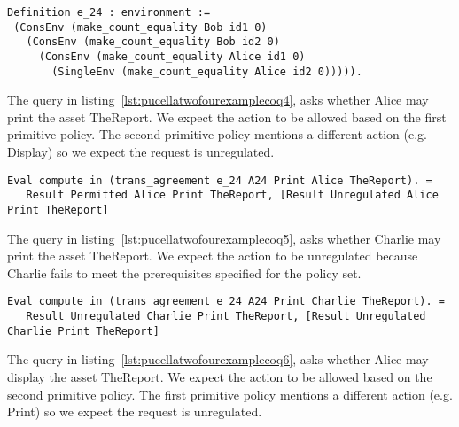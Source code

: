 \begin{minipage}[c]{0.95\textwidth}
\begin{lstlisting}
Definition e_24 : environment :=
 (ConsEnv (make_count_equality Bob id1 0)
   (ConsEnv (make_count_equality Bob id2 0)
     (ConsEnv (make_count_equality Alice id1 0)
       (SingleEnv (make_count_equality Alice id2 0))))).
\end{lstlisting}
\end{minipage} 

The query in listing~\ref{lst:pucellatwofourexamplecoq4}, asks whether Alice may print the asset TheReport. We expect the action to be allowed based on the first primitive policy. The second primitive policy mentions a different action (e.g. Display) so we expect the request is unregulated. 

\begin{minipage}[c]{0.95\textwidth}
\begin{lstlisting}
Eval compute in (trans_agreement e_24 A24 Print Alice TheReport). = 
   Result Permitted Alice Print TheReport, [Result Unregulated Alice Print TheReport]
\end{lstlisting}
\end{minipage} 

The query in listing~\ref{lst:pucellatwofourexamplecoq5}, asks whether Charlie may print the asset TheReport. We expect the action to be unregulated because Charlie fails to meet the prerequisites specified for the policy set. 

\begin{minipage}[c]{0.95\textwidth}
\begin{lstlisting}
Eval compute in (trans_agreement e_24 A24 Print Charlie TheReport). = 
   Result Unregulated Charlie Print TheReport, [Result Unregulated Charlie Print TheReport]
\end{lstlisting}
\end{minipage} 

The query in listing~\ref{lst:pucellatwofourexamplecoq6}, asks whether Alice may display the asset TheReport. We expect the action to be allowed based on the second primitive policy. The first primitive policy mentions a different action (e.g. Print) so we expect the request is unregulated. 


